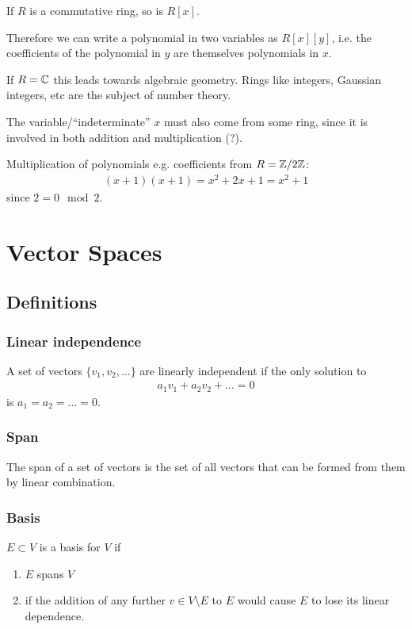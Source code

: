 If $R$ is a commutative ring, so is $R[x]$.

Therefore we can write a polynomial in two variables as $R[x][y]$, i.e. the
coefficients of the polynomial in $y$ are themselves polynomials in $x$.

If $R = \mathbb{C}$ this leads towards algebraic geometry. Rings like integers,
Gaussian integers, etc are the subject of number theory.

The variable/``indeterminate'' $x$ must also come from some ring, since it is
involved in both addition and multiplication (?).

Multiplication of polynomials e.g. coefficients from $R = \mathbb{Z}/2\mathbb{Z}$:
\begin{align*}
(x + 1)(x + 1) = x^2 + 2x + 1 = x^2 + 1
\end{align*}
since $2 = 0 \mod 2$.

\section{Vector Spaces}

\subsection{Definitions}

\subsubsection{Linear independence}
A set of vectors $\{v_1, v_2, \ldots\}$ are linearly independent if the only
solution to
\begin{align*}
  a_1v_1 + a_2v_2 + \ldots = 0
\end{align*}
is $a_1 = a_2 = \ldots = 0$.


\subsubsection{Span}
The span of a set of vectors is the set of all vectors that can be formed from
them by linear combination.


\subsubsection{Basis}
$E \subset V$ is a basis for $V$ if
\begin{enumerate}
\item $E$ spans $V$
\item if the addition of any further $v \in V\setminus E$ to $E$ would cause
  $E$ to lose its linear dependence.
\end{enumerate}


